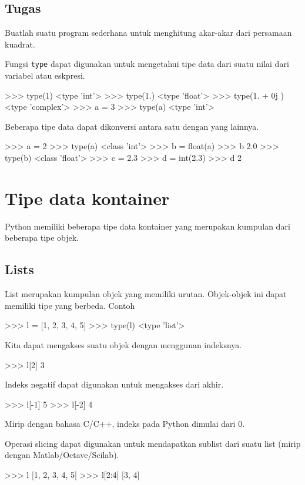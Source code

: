 \documentclass[a4paper,11pt]{extarticle}
\begin{document}
\subsection*{Tugas}

Buatlah suatu program sederhana untuk menghitung akar-akar dari
persamaan kuadrat.



Fungsi \texttt{type} dapat digunakan untuk mengetahui tipe data dari
suatu nilai dari variabel atau eskpresi.
\begin{pyconcode}
>>> type(1)
<type 'int'>
>>> type(1.)
<type 'float'>
>>> type(1. + 0j )
<type 'complex'>
>>> a = 3
>>> type(a)
<type 'int'>
\end{pyconcode}


Beberapa tipe data dapat dikonversi antara satu dengan yang lainnya.
\begin{pyconcode}
>>> a = 2
>>> type(a)
<class 'int'>
>>> b = float(a)
>>> b
2.0
>>> type(b)
<class 'float'>
>>> c = 2.3
>>> d = int(2.3)
>>> d
2
\end{pyconcode}

\section{Tipe data kontainer}
Python memiliki beberapa tipe data kontainer yang merupakan kumpulan
dari beberapa tipe objek.

\subsection{Lists}
List merupakan kumpulan objek yang memiliki urutan. Objek-objek ini
dapat memiliki tipe yang berbeda. Contoh
\begin{pyconcode}
>>> l = [1, 2, 3, 4, 5]
>>> type(l)
<type 'list'>
\end{pyconcode}

Kita dapat mengakses suatu objek dengan menggunan indeksnya.
\begin{pyconcode}
>>> l[2]
3
\end{pyconcode}

Indeks negatif dapat digunakan untuk mengakses dari akhir.
\begin{pyconcode}
>>> l[-1]
5
>>> l[-2]
4
\end{pyconcode}

Mirip dengan bahasa C/C++, indeks pada Python dimulai dari 0.

Operasi slicing dapat digunakan untuk mendapatkan sublist dari
suatu list (mirip dengan Matlab/Octave/Scilab).
\begin{pyconcode}
>>> l
[1, 2, 3, 4, 5]
>>> l[2:4]
[3, 4]
\end{pyconcode}
\end{document}
